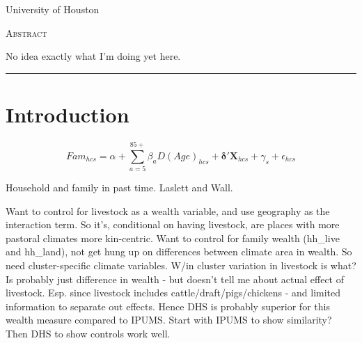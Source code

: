 \documentclass[11pt]{article}
\begin{document}
\begin{titlepage}
\vspace{2in} \noindent {\large \today}

\vspace{.5in} 

\vspace{.25in} 

\vspace{.05in} \noindent University of Houston

\vfill \noindent \textsc{Abstract} \hrulefill

\vspace{.05in} \noindent No idea exactly what I'm doing yet here. 

\vspace{.1in} \hrule

\vspace{.5in} 

\vspace{.1in} 

\vspace{.1in} 
\end{titlepage}

\pagebreak 

\section{Introduction}
\onehalfspacing 

\begin{equation}
	Fam_{hcs} = \alpha + \sum_{a=5}^{85+} \beta_a D(Age)_{hcs} + \mathbf{\delta}' \mathbf{X}_{hcs} + \gamma_s + \epsilon_{hcs}
\end{equation}


Household and family in past time. Laslett and Wall.

Want to control for livestock as a wealth variable, and use geography as the interaction term. So it's, conditional on having livestock, are places with more pastoral climates more kin-centric. Want to control for family wealth (hh_live and hh_land), not get hung up on differences between climate area in wealth. So need cluster-specific climate variables. W/in cluster variation in livestock is what? Is probably just difference in wealth - but doesn't tell me about actual effect of livestock. Esp. since livestock includes cattle/draft/pigs/chickens - and limited information to separate out effects. Hence DHS is probably superior for this wealth measure compared to IPUMS. Start with IPUMS to show similarity? Then DHS to show controls work well.
\end{document}
